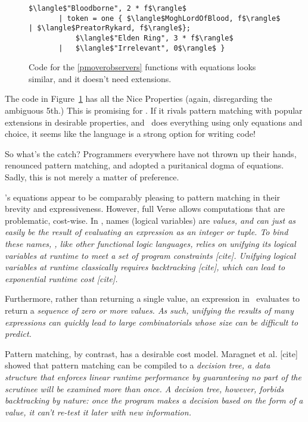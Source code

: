 \documentclass[manuscript,screen,review, 12pt, nonacm]{acmart}
\begin{document}
\begin{outline}[enumerate]
\begin{figure}[ht]
\begin{minipage}[h]{\linewidth}
\begin{lstlisting}[numbers=none, basicstyle=\tiny, xleftmargin=9em, 
                            frame=single]
           $\langle$"Bloodborne", 2 * f$\rangle$
       | token = one { $\langle$MoghLordOfBlood, f$\rangle$ | $\langle$PreatorRykard, f$\rangle$}; 
           $\langle$"Elden Ring", 3 * f$\rangle$
       |   $\langle$"Irrelevant", 0$\rangle$ }
          \end{lstlisting}
            \label{fig:versegot} 
        \vspace{4ex}
        \end{minipage}%
    \caption{Code for the \ref{pmoverobservers} functions with equations looks
    similar, and it doesn't need extensions.}
    \label{fig:verseextfuncs}
      \end{figure}
        
    The code in Figure~\ref{fig:verseextfuncs} has all the Nice Properties
    (again, disregarding the ambiguous 5th.) This is promising for \VC. If it
    rivals pattern matching with popular extensions in desirable properties, and
    \VC\ does everything using only equations and choice, it seems like the
    language is a strong option for writing code! 

    So what's the catch? Programmers everywhere have not thrown up their hands,
    renounced pattern matching, and adopted a puritanical dogma of equations. 
    Sadly, this is not merely a matter of preference. 

    \VC's equations appear to be comparably pleasing to pattern matching in
    their brevity and expressiveness. However, full Verse allows computations
    that are problematic, cost-wise. In \VC, names (logical variables) are
    \it{values}, and can just as easily be the result of evaluating an
    expression as an integer or tuple. To bind these names, \VC, like other
    functional logic languages, relies on unifying its logical variables at
    runtime to meet a set of program constraints [cite]. Unifying logical
    variables at runtime classically requires backtracking [cite], which can
    lead to exponential runtime cost [cite]. 
        
    Furthermore, rather than returning a single value, an expression in \VC\
    evaluates to return a \it{sequence} of zero or more values. As such,
    unifying the results of many expressions can quickly lead to large 
    combinatorials whose size can be difficult to predict. 


    Pattern matching, by contrast, has a desirable cost model. Maragnet et al.
    [cite] showed that pattern matching can be compiled to a \it{decision tree},
    a data structure that enforces linear runtime performance by guaranteeing no
    part of the scrutinee will be examined more than once. A decision tree,
    however, forbids backtracking by nature: once the program makes a decision
    based on the form of a value, it can't re-test it later with new
    information. 
    


\end{outline}
\end{document}
